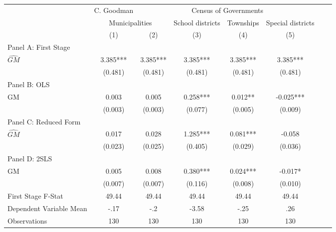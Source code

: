  \begin{tabular}{l*{7}{c}} \toprule
&\multicolumn{1}{c}{C. Goodman}&\multicolumn{4}{c}{Census of Governments}\\\cmidrule(lr){2-2}\cmidrule(lr){3-6}
&\multicolumn{2}{c}{Municipalities}&\multicolumn{1}{c}{School districts}&\multicolumn{1}{c}{Townships}&\multicolumn{1}{c}{Special districts}\\\cmidrule(lr){2-3}\cmidrule(lr){4-6}
&\multicolumn{1}{c}{(1)}&\multicolumn{1}{c}{(2)}&\multicolumn{1}{c}{(3)}&\multicolumn{1}{c}{(4)}&\multicolumn{1}{c}{(5)}\\
\cmidrule(lr){1-6}
\multicolumn{5}{l}{Panel A: First Stage}\\
\cmidrule(lr){1-6}
$\widehat{GM}$  &    3.385***&    3.385***&    3.385***&    3.385***&    3.385***\\
                &  (0.481)   &  (0.481)   &  (0.481)   &  (0.481)   &  (0.481)   \\
\cmidrule(lr){1-6}
\multicolumn{5}{l}{Panel B: OLS}\\
\cmidrule(lr){1-6}
GM              &    0.003   &    0.005   &    0.258***&    0.012** &   -0.025***\\
                &  (0.003)   &  (0.003)   &  (0.077)   &  (0.005)   &  (0.009)   \\
\cmidrule(lr){1-6}
\multicolumn{5}{l}{Panel C: Reduced Form}\\
\cmidrule(lr){1-6}
$\widehat{GM}$  &    0.017   &    0.028   &    1.285***&    0.081***&   -0.058   \\
                &  (0.023)   &  (0.025)   &  (0.405)   &  (0.029)   &  (0.036)   \\
\cmidrule(lr){1-6}
\multicolumn{5}{l}{Panel D: 2SLS}\\
\cmidrule(lr){1-6}
GM              &    0.005   &    0.008   &    0.380***&    0.024***&   -0.017*  \\
                &  (0.007)   &  (0.007)   &  (0.116)   &  (0.008)   &  (0.010)   \\
\midrule
First Stage F-Stat&    49.44   &    49.44   &    49.44   &    49.44   &    49.44   \\
Dependent Variable Mean&     -.17   &      -.2   &    -3.58   &     -.25   &      .26   \\
Observations    &      130   &      130   &      130   &      130   &      130   \\
 \bottomrule \end{tabular}
